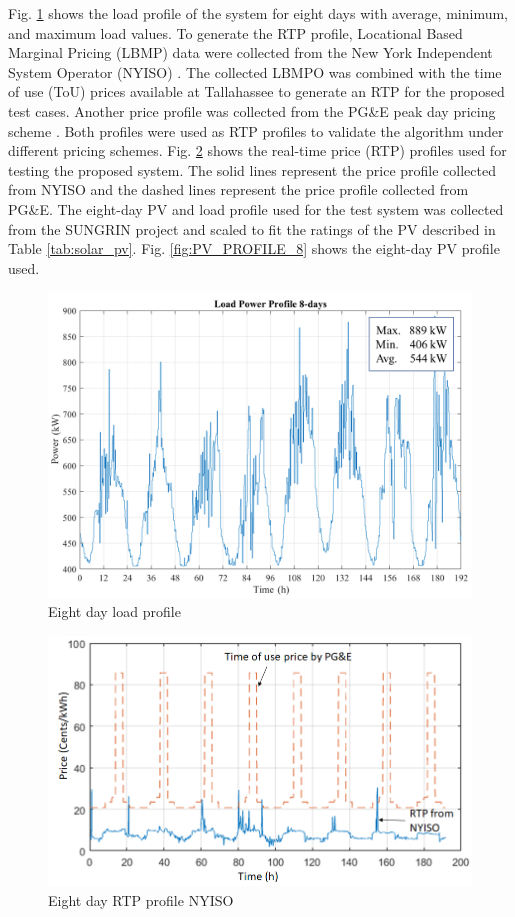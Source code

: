 Fig. \ref{fig:LOAD_PROFILE_8} shows the load profile of the system for eight days with average, minimum, and maximum load values. To generate the RTP profile, Locational Based Marginal Pricing (LBMP) data were collected from the New York Independent System Operator (NYISO) \cite{NYISO2017}. The collected LBMPO was combined with the time of use (ToU) prices available at Tallahassee to generate an RTP for the proposed test cases. Another price profile was collected from the PG\&E peak day pricing scheme \cite{pgne}. Both profiles were used as RTP profiles to validate the algorithm under different pricing schemes. Fig. \ref{fig:RTP_PROFILE_8} shows the real-time price (RTP) profiles used for testing the proposed system. The solid lines represent the price profile collected from NYISO and the dashed lines represent the price profile collected from PG\&E. The eight-day PV and load profile used for the test system was collected from the SUNGRIN project and scaled to fit the ratings of the PV described in Table \ref{tab:solar_pv}. Fig. \ref{fig:PV_PROFILE_8} shows the eight-day PV profile used.

\begin{figure}[!ht]
    \centering
    \includegraphics[width = 0.6\linewidth]{figs/A8/loadprofile.png}
    \caption{Eight day load profile}
    \label{fig:LOAD_PROFILE_8}
\end{figure}

\begin{figure}[!ht]
    \centering
    \includegraphics[width = 0.5\linewidth]{figs/A8/Price_profiles.png}
    \caption{Eight day RTP profile NYISO}
    \label{fig:RTP_PROFILE_8}
\end{figure}

